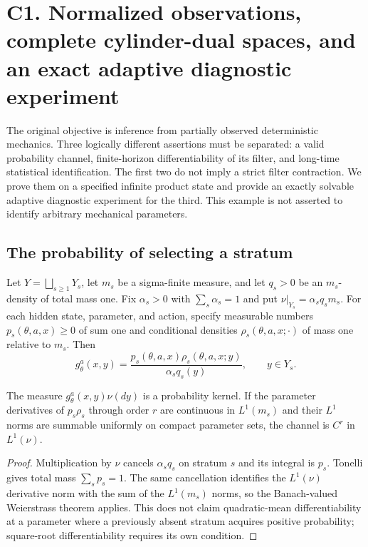 \section{C1. Normalized observations, complete cylinder-dual spaces, and an exact adaptive diagnostic experiment}
\label{sec:r33-c1}

The original objective is inference from partially observed deterministic
mechanics.  Three logically different assertions must be separated: a valid
probability channel, finite-horizon differentiability of its filter, and
long-time statistical identification.  The first two do not imply a strict
filter contraction.  We prove them on a specified infinite product state and
provide an exactly solvable adaptive diagnostic experiment for the third.
This example is not asserted to identify arbitrary mechanical parameters.

\subsection{The probability of selecting a stratum}

Let $Y=\bigsqcup_{s\ge1}Y_s$, let $m_s$ be a sigma-finite measure, and let
$q_s>0$ be an $m_s$-density of total mass one.  Fix $\alpha_s>0$ with
$\sum_s\alpha_s=1$ and put $\nu|_{Y_s}=\alpha_sq_sm_s$.
For each hidden state, parameter, and action, specify measurable numbers
$p_s(\theta,a,x)\ge0$ of sum one and conditional densities
$\rho_s(\theta,a,x;\cdot)$ of mass one relative to $m_s$.  Then
\begin{equation}\label{eq:r33-c1-density}
 g_\theta^a(x,y)=
 \frac{p_s(\theta,a,x)\rho_s(\theta,a,x;y)}{\alpha_sq_s(y)},
 \qquad y\in Y_s.
\end{equation}

\begin{proposition}
\label{prop:r33-c1-channel}
The measure $g_\theta^a(x,y)\nu(dy)$ is a probability kernel.  If the
parameter derivatives of $p_s\rho_s$ through order $r$ are continuous in
$L^1(m_s)$ and their $L^1$ norms are summable uniformly on compact parameter
sets, the channel is $C^r$ in $L^1(\nu)$.
\end{proposition}
\begin{proof}
Multiplication by $\nu$ cancels $\alpha_sq_s$ on stratum $s$ and its integral
is $p_s$.  Tonelli gives total mass $\sum_sp_s=1$.  The same cancellation
identifies the $L^1(\nu)$ derivative norm with the sum of the $L^1(m_s)$
norms, so the Banach-valued Weierstrass theorem applies.  This does not claim
quadratic-mean differentiability at a parameter where a previously absent
stratum acquires positive probability; square-root differentiability requires
its own condition.
\end{proof}

